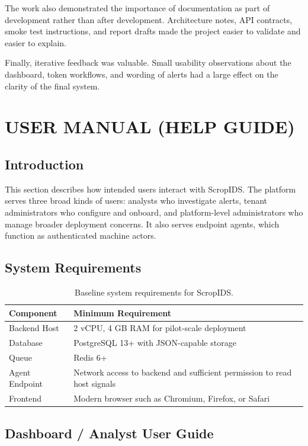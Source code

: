 \documentclass[12pt,a4paper]{article}
\begin{document}
The work also demonstrated the importance of documentation as part of development rather than after development. Architecture notes, API contracts, smoke test instructions, and report drafts made the project easier to validate and easier to explain.

Finally, iterative feedback was valuable. Small usability observations about the dashboard, token workflows, and wording of alerts had a large effect on the clarity of the final system.

\clearpage
\section{USER MANUAL (HELP GUIDE)}

\subsection{Introduction}
This section describes how intended users interact with ScropIDS. The platform serves three broad kinds of users: analysts who investigate alerts, tenant administrators who configure and onboard, and platform-level administrators who manage broader deployment concerns. It also serves endpoint agents, which function as authenticated machine actors.

\subsection{System Requirements}
\begin{table}[H]
\centering
\begin{tabularx}{\textwidth}{L{4cm}Y}
\toprule
\textbf{Component} & \textbf{Minimum Requirement} \\
\midrule
Backend Host & 2 vCPU, 4 GB RAM for pilot-scale deployment \\
Database & PostgreSQL 13+ with JSON-capable storage \\
Queue & Redis 6+ \\
Agent Endpoint & Network access to backend and sufficient permission to read host signals \\
Frontend & Modern browser such as Chromium, Firefox, or Safari \\
\bottomrule
\end{tabularx}
\caption{Baseline system requirements for ScropIDS.}
\label{tab:system-requirements}
\end{table}

\subsection{Dashboard / Analyst User Guide}
\end{document}
